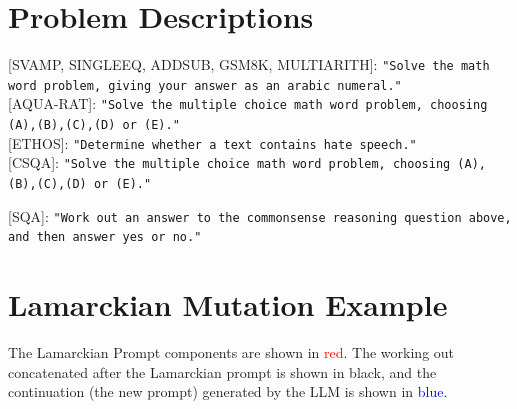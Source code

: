 \documentclass{article} %
\newcommand{\prompt}[1]{\footnotesize{\texttt{"#1"}}\normalsize}
\begin{document}
\section{Problem Descriptions}
\label{appendix:problem_specifications}

[SVAMP, SINGLEEQ, ADDSUB, GSM8K, MULTIARITH]: \prompt{Solve the math word problem, giving your answer as an arabic numeral.}\\

[AQUA-RAT]: \prompt{Solve the multiple choice math word problem, choosing (A),(B),(C),(D) or (E).}\\

[ETHOS]: \prompt{Determine whether a text contains hate speech.}\\

[CSQA]: \prompt{Solve the multiple choice math word problem, choosing (A),(B),(C),(D) or (E).}

[SQA]: \prompt{Work out an answer to the commonsense reasoning question above, and then answer yes or no.}


\section{Lamarckian Mutation Example }
\label{appendix:lamarck}


The Lamarckian Prompt components are shown in \textcolor{red}{red}. The working out concatenated after the Lamarckian prompt is shown in black, and the continuation (the new prompt) generated by the LLM is shown in \textcolor{blue}{blue}.
\end{document}
